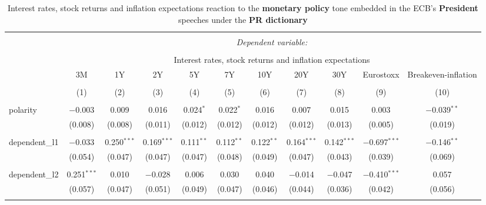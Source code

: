 
\begin{table}[!htbp] \centering 
  \caption[PR Monetary Policy Tone \& Interest Rates, Stock Returns, Inflation Expectations: president speeches]{Interest rates, stock returns and inflation expectations reaction to the \textbf{monetary policy} tone embedded in the ECB's \textbf{President} speeches under the \textbf{PR dictionary}} 
  \label{tab:assets_president_pr_mp} 
  \begin{adjustbox}{width=1.25\textwidth}
\begin{tabular}{@{\extracolsep{5pt}}lcccccccccc} 
\\[-1.8ex]\hline 
\hline \\[-1.8ex] 
 & \multicolumn{10}{c}{\textit{Dependent variable:}} \\ 
\cline{2-11} 
\\[-1.8ex] & \multicolumn{10}{c}{Interest rates, stock returns and inflation expectations} \\ 
 &  3M & 1Y & 2Y & 5Y & 7Y & 10Y & 20Y & 30Y & Eurostoxx & Breakeven-inflation \\ 
\\[-1.8ex] & (1) & (2) & (3) & (4) & (5) & (6) & (7) & (8) & (9) & (10)\\ 
\hline \\[-1.8ex] 
 polarity & $-$0.003 & 0.009 & 0.016 & 0.024$^{*}$ & 0.022$^{*}$ & 0.016 & 0.007 & 0.015 & 0.003 & $-$0.039$^{**}$ \\ 
  & (0.008) & (0.008) & (0.011) & (0.012) & (0.012) & (0.012) & (0.012) & (0.013) & (0.005) & (0.019) \\ 
  & & & & & & & & & & \\ 
 dependent\_l1 & $-$0.033 & 0.250$^{***}$ & 0.169$^{***}$ & 0.111$^{**}$ & 0.112$^{**}$ & 0.122$^{**}$ & 0.164$^{***}$ & 0.142$^{***}$ & $-$0.697$^{***}$ & $-$0.146$^{**}$ \\ 
  & (0.054) & (0.047) & (0.047) & (0.047) & (0.048) & (0.049) & (0.047) & (0.043) & (0.039) & (0.069) \\ 
  & & & & & & & & & & \\ 
 dependent\_l2 & 0.251$^{***}$ & 0.010 & $-$0.028 & 0.006 & 0.030 & 0.040 & $-$0.014 & $-$0.047 & $-$0.410$^{***}$ & 0.057 \\ 
  & (0.057) & (0.047) & (0.051) & (0.049) & (0.047) & (0.046) & (0.044) & (0.036) & (0.042) & (0.056) \\ 
  & & & & & & & & & & \\ 

\end{tabular}
\end{adjustbox}
\end{table}
